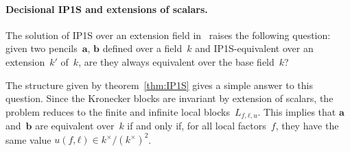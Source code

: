 \documentclass{article}%
\begin{document}
\paragraph{Decisional IP1S and extensions of scalars.}

The solution of IP1S over an extension field
in~\cite{DBLP:journals/corr/BerthomieuFP13} raises the following
question: given two pencils~$\bm{a}$, $\bm{b}$ defined over a field~$k$
and IP1S-equivalent over an extension~$k'$ of~$k$, are they always
equivalent over the base field~$k$?

The structure given by theorem~\ref{thm:IP1S} gives a simple answer
to this question. Since the Kronecker blocks are invariant by extension of
scalars, the problem reduces to the finite and infinite local
blocks~$L_{f,ℓ,u}$.
This implies that $\bm{a}$ and~$\bm{b}$ are equivalent over~$k$
if and only if, for all local factors~$f$, they have the same value
$u(f, ℓ) ∈ k^{×}/(k^{×})^2$.

% 
\end{document}
